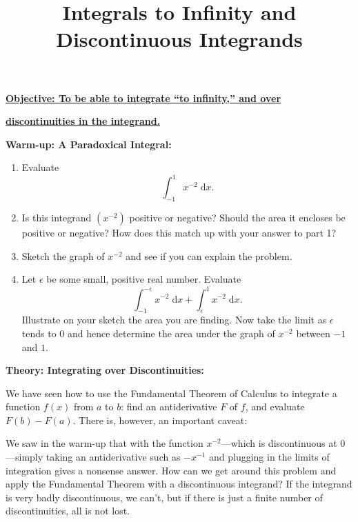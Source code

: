 \documentclass{article}
\newcommand{\diff}{\;\mathrm{d}}
\begin{document}
\title{Integrals to Infinity and Discontinuous Integrands}
\date{}

\maketitle
\thispagestyle{empty}

\Large

\textbf{\underline{Objective: To be able to integrate ``to infinity,'' and over}}

\textbf{\underline{discontinuities in the integrand.}}






\vspace{5mm}




\textbf{Warm-up: A Paradoxical Integral:}\bigskip


\begin{enumerate}
	\item Evaluate
		\[\int_{-1}^1 x^{-2} \diff x.\]
	\item Is this integrand $(x^{-2})$ positive or negative? Should the area it encloses be positive or negative? How does this match up with your answer to part 1?
	\item Sketch the graph of $x^{-2}$ and see if you can explain the problem.
	\item Let $\epsilon$ be some small, positive real number. Evaluate
		\[\int_{-1}^{-\epsilon}x^{-2}\diff x + \int_\epsilon^1 x^{-2}\diff x.\]
		Illustrate on your sketch the area you are finding. Now take the limit as $\epsilon$ tends to 0 and hence determine the area under the graph of $x^{-2}$ between $-1$ and $1$.
\end{enumerate}



\clearpage






\textbf{Theory: Integrating over Discontinuities:}\bigskip


We have seen how to use the Fundamental Theorem of Calculus to integrate a function $f(x)$ from $a$ to $b$: find an antiderivative $F$ of $f$, and evaluate $F(b)-F(a)$. There is, however, an important caveat:\bigskip

\noindent{}\bigskip

We saw in the warm-up that with the function $x^{-2}$---which is discontinuous at 0---simply taking an antiderivative such as $-x^{-1}$ and plugging in the limits of integration gives a nonsense answer. How can we get around this problem and apply the Fundamental Theorem with a discontinuous integrand? If the integrand is very badly discontinuous, we can't, but if there is just a finite number of discontinuities, all is not lost.
\end{document}
